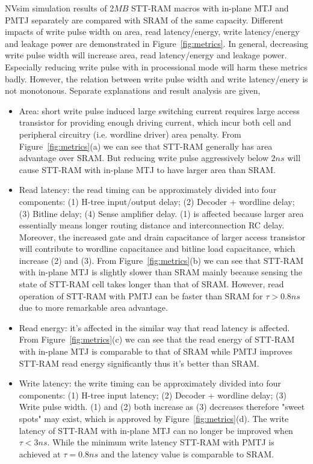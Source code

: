 NVsim simulation results of 2$MB$ STT-RAM macros with in-plane MTJ and PMTJ separately are compared with SRAM of the same capacity. Different impacts of write pulse width on area, read latency/energy, write latency/energy and leakage power are demonstrated in Figure~\ref{fig:metrics}. In general, decreasing write pulse width will increase area, read latency/energy and leakage power. Especially reducing write pulse with in processional mode will harm these metrics badly. However, the relation between write pulse width and write latency/enery is not monotonous. Separate explanations and result analysis are given,
\begin{itemize}
\item Area: short write pulse induced large switching current requires large access transistor for providing enough driving current, which incur both cell and peripheral circuitry (i.e. wordline driver) area penalty. From Figure~\ref{fig:metrics}(a) we can see that STT-RAM generally has area advantage over SRAM. But reducing write pulse aggressively below $2ns$ will cause STT-RAM with in-plane MTJ to have larger area than SRAM.
\item Read latency: the read timing can be approximately divided into four components: (1) H-tree input/output delay; (2) Decoder + wordline delay; (3) Bitline delay; (4) Sense amplifier delay. (1) is affected because larger area essentially means longer routing distance and interconnection RC delay. Moreover, the increased gate and drain capacitance of larger access transistor will contribute to wordline capacitance and bitline load capacitance, which increase (2) and (3). From Figure~\ref{fig:metrics}(b) we can see that STT-RAM with in-plane MTJ is slightly slower than SRAM mainly because sensing the state of STT-RAM cell takes longer than that of SRAM. However, read operation of STT-RAM with PMTJ can be faster than SRAM for $\tau > 0.8ns$ due to more remarkable area advantage.
\item Read energy: it's affected in the similar way that read latency is affected. From Figure~\ref{fig:metrics}(c) we can see that the read energy of STT-RAM with in-plane MTJ is comparable to that of SRAM while PMTJ improves STT-RAM read energy significantly thus it's better than SRAM.
\item Write latency: the write timing can be approximately divided into four components: (1) H-tree input latency; (2) Decoder + wordline delay; (3) Write pulse width. (1) and (2) both increase as (3) decreases therefore "sweet spots" may exist, which is approved by Figure~\ref{fig:metrics}(d). The write latency of STT-RAM with in-plane MTJ can no longer be improved when $\tau < 3ns$. While the minimum write latency STT-RAM with PMTJ is achieved at $\tau = 0.8ns$ and the latency value is comparable to SRAM.

\end{itemize}
